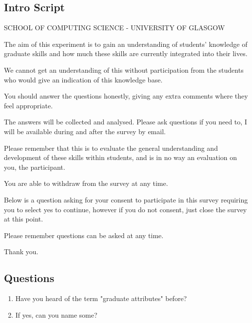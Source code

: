 \documentclass{l4proj}
\begin{document}
\begin{appendices}
\subsection{Intro Script}

SCHOOL OF COMPUTING SCIENCE - UNIVERSITY OF GLASGOW

The aim of this experiment is to gain an understanding of students' knowledge of graduate skills and how much these skills are currently integrated into their lives. 

We cannot get an understanding of this without participation from the students who would give an indication of this knowledge base. 

You should answer the questions honestly, giving any extra comments where they feel appropriate.

The answers will be collected and analysed. Please ask questions if you need to, I will be available during and after the survey by email.

Please remember that this is to evaluate the general understanding and development of these skills within students, and is in no way an evaluation on you, the participant.

You are able to withdraw from the survey at any time.

Below is a question asking for your consent to participate in this survey requiring you to select yes to continue, however if you do not consent, just close the survey at this point.

Please remember questions can be asked at any time.

Thank you.

\subsection{Questions}

\begin{enumerate}
    \item Have you heard of the term "graduate attributes" before?
    \item If yes, can you name some?


\end{enumerate}
\end{appendices}
\end{document}
